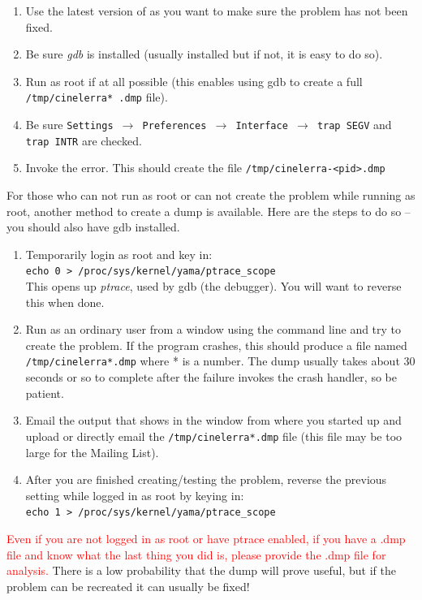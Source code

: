 \begin{enumerate}[nosep]
	\item Use the latest version of \CGG{} as you want to make sure the problem has not been fixed.
	\item Be sure \textit{gdb} is installed (usually installed but if not, it is easy to do so).
    \item Run as root if at all possible (this enables using gdb to create a full \texttt{/tmp/cinelerra* .dmp} file).
    \item Be sure \texttt{Settings $\rightarrow$ Preferences $\rightarrow$ Interface $\rightarrow$ trap SEGV} and \texttt{trap INTR} are checked.
	\item Invoke the error. This should create the file \texttt{/tmp/cinelerra-<pid>.dmp}
\end{enumerate}
\medskip

For those who can not run as root or can not create the problem while running as root, another method to create a dump
is available. Here are the steps to do so -- you should also have gdb installed.
\medskip

\begin{enumerate}[nosep]
	\item Temporarily login as root and key in:\\
	\texttt{echo 0 > /proc/sys/kernel/yama/ptrace\_scope} \\
	This opens up \textit{ptrace}, used by gdb (the debugger). You will want to reverse this when done.
	\item Run \CGG{} as an ordinary user from a window using the command line and try to create the problem. If the program crashes, this should produce a file named \texttt{/tmp/cinelerra*.dmp} where * is a number. The dump usually takes about 30 seconds or so to complete after the failure invokes the crash handler, so be patient. 
	\item Email the output that shows in the window from where you started up \CGG{} and upload or directly email the \texttt{/tmp/cinelerra*.dmp} file (this file may be too large for the Mailing List).
	\item After you are finished creating/testing the problem, reverse the previous setting while logged in as root by keying in:\\
	\texttt{echo 1 > /proc/sys/kernel/yama/ptrace\_scope}
\end{enumerate}

\textcolor{red}{Even if you are not logged in as root or have ptrace enabled, if you
have a .dmp file and know what the last thing you did is, please provide the .dmp file for analysis.} There is a low
probability that the dump will prove useful, but if the problem can be recreated it can usually be fixed!

